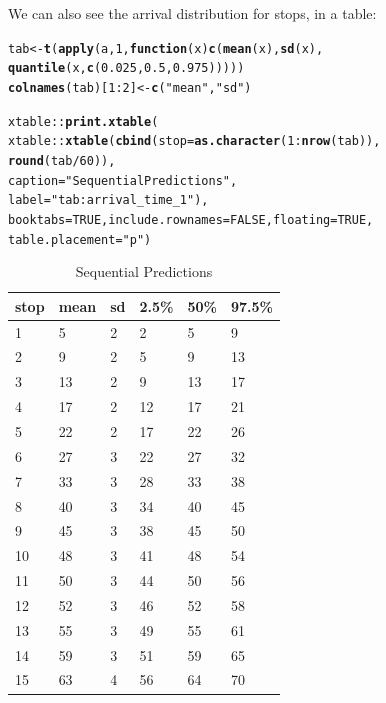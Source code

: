 \documentclass[11pt]{article}\usepackage[]{graphicx}\usepackage[]{color}
\makeatletter
\newcommand{\hlnum}[1]{\textcolor[rgb]{0.686,0.059,0.569}{#1}}%
\newcommand{\hlstr}[1]{\textcolor[rgb]{0.192,0.494,0.8}{#1}}%
\newcommand{\hlopt}[1]{\textcolor[rgb]{0,0,0}{#1}}%
\newcommand{\hlstd}[1]{\textcolor[rgb]{0.345,0.345,0.345}{#1}}%
\newcommand{\hlkwa}[1]{\textcolor[rgb]{0.161,0.373,0.58}{\textbf{#1}}}%
\newcommand{\hlkwb}[1]{\textcolor[rgb]{0.69,0.353,0.396}{#1}}%
\newcommand{\hlkwc}[1]{\textcolor[rgb]{0.333,0.667,0.333}{#1}}%
\newcommand{\hlkwd}[1]{\textcolor[rgb]{0.737,0.353,0.396}{\textbf{#1}}}%
\newenvironment{kframe}{%
 \def\at@end@of@kframe{}%
 \ifinner\ifhmode%
  \def\at@end@of@kframe{\end{minipage}}%
  \begin{minipage}{\columnwidth}%
 \fi\fi%
 \def\FrameCommand##1{\hskip\@totalleftmargin \hskip-\fboxsep
 \colorbox{shadecolor}{##1}\hskip-\fboxsep
     \hskip-\linewidth \hskip-\@totalleftmargin \hskip\columnwidth}%
 \MakeFramed {\advance\hsize-\width
   \@totalleftmargin\z@ \linewidth\hsize
   \@setminipage}}%
 {\par\unskip\endMakeFramed%
 \at@end@of@kframe}
\makeatother
\begin{document}
We can also see the arrival distribution for stops, in a table:
\begin{kframe}
\begin{alltt}
\hlstd{tab} \hlkwb{<-} \hlkwd{t}\hlstd{(}\hlkwd{apply}\hlstd{(a,} \hlnum{1}\hlstd{,} \hlkwa{function}\hlstd{(}\hlkwc{x}\hlstd{)} \hlkwd{c}\hlstd{(}\hlkwd{mean}\hlstd{(x),} \hlkwd{sd}\hlstd{(x),}
                                   \hlkwd{quantile}\hlstd{(x,} \hlkwd{c}\hlstd{(}\hlnum{0.025}\hlstd{,} \hlnum{0.5}\hlstd{,} \hlnum{0.975}\hlstd{)))))}
\hlkwd{colnames}\hlstd{(tab)[}\hlnum{1}\hlopt{:}\hlnum{2}\hlstd{]} \hlkwb{<-} \hlkwd{c}\hlstd{(}\hlstr{"mean"}\hlstd{,} \hlstr{"sd"}\hlstd{)}

\hlstd{xtable}\hlopt{::}\hlkwd{print.xtable}\hlstd{(}
    \hlstd{xtable}\hlopt{::}\hlkwd{xtable}\hlstd{(}\hlkwd{cbind}\hlstd{(}\hlkwc{stop} \hlstd{=} \hlkwd{as.character}\hlstd{(}\hlnum{1}\hlopt{:}\hlkwd{nrow}\hlstd{(tab)),}
                         \hlkwd{round}\hlstd{(tab} \hlopt{/} \hlnum{60}\hlstd{)),}
                   \hlkwc{caption} \hlstd{=} \hlstr{"Sequential Predictions"}\hlstd{,}
                   \hlkwc{label} \hlstd{=} \hlstr{"tab:arrival_time_1"}\hlstd{),}
    \hlkwc{booktabs} \hlstd{=} \hlnum{TRUE}\hlstd{,} \hlkwc{include.rownames} \hlstd{=} \hlnum{FALSE}\hlstd{,} \hlkwc{floating} \hlstd{=} \hlnum{TRUE}\hlstd{,}
    \hlkwc{table.placement} \hlstd{=} \hlstr{"p"}\hlstd{)}
\end{alltt}
\end{kframe}%
\begin{table}[p]
\centering
\begin{tabular}{llllll}
  \toprule
stop & mean & sd & 2.5\% & 50\% & 97.5\% \\ 
  \midrule
1 & 5 & 2 & 2 & 5 & 9 \\ 
  2 & 9 & 2 & 5 & 9 & 13 \\ 
  3 & 13 & 2 & 9 & 13 & 17 \\ 
  4 & 17 & 2 & 12 & 17 & 21 \\ 
  5 & 22 & 2 & 17 & 22 & 26 \\ 
  6 & 27 & 3 & 22 & 27 & 32 \\ 
  7 & 33 & 3 & 28 & 33 & 38 \\ 
  8 & 40 & 3 & 34 & 40 & 45 \\ 
  9 & 45 & 3 & 38 & 45 & 50 \\ 
  10 & 48 & 3 & 41 & 48 & 54 \\ 
  11 & 50 & 3 & 44 & 50 & 56 \\ 
  12 & 52 & 3 & 46 & 52 & 58 \\ 
  13 & 55 & 3 & 49 & 55 & 61 \\ 
  14 & 59 & 3 & 51 & 59 & 65 \\ 
  15 & 63 & 4 & 56 & 64 & 70 \\ 
   \bottomrule
\end{tabular}
\caption{Sequential Predictions} 
\label{tab:arrival_time_1}
\end{table}
\end{document}
